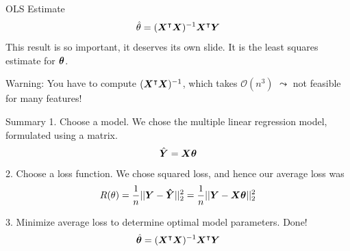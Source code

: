 \documentclass[aspectratio=169]{../latex_main/tntbeamer}  %
\begin{document}
	\begin{frame}[c]{OLS Estimate}
	\begin{equation*}
	   \hat{\theta} = (\bm{X}^\intercal\bm{X})^{-1} \bm{X}^\intercal\bm{Y} 
	\end{equation*}
	This result is so important, it deserves its own slide.
It is the least squares estimate for $\bm{\theta}$.

    \bigskip
    \alert{Warning}: You have to compute $(\bm{X}^\intercal\bm{X})^{-1}$, which takes $\mathcal{O}(n^3)$ $\leadsto$ not feasible for many features!

	\end{frame}
	
	
	\begin{frame}{Summary}
	    1. Choose a model. We chose the multiple linear regression model, formulated using a matrix.
        \begin{equation*}
            \hat{\bm{Y}} = \bm{X}\bm{\theta}
        \end{equation*}
        2. Choose a loss function. We chose squared loss, and hence our average loss was
        \begin{equation*}
            R(\theta) = \frac{1}{n}||\bm{Y} - \bm{\hat{Y}}||_2^2 = \frac{1}{n}||\bm{Y} - \bm{X}\bm{\theta}||_2^2
        \end{equation*}
        
        3. Minimize average loss to determine optimal model parameters. Done!
        \begin{equation*}
	        \hat{\bm{\theta}} = (\bm{X}^\intercal\bm{X})^{-1} \bm{X}^\intercal\bm{Y} 
	    \end{equation*}
	\end{frame}
\end{document}
